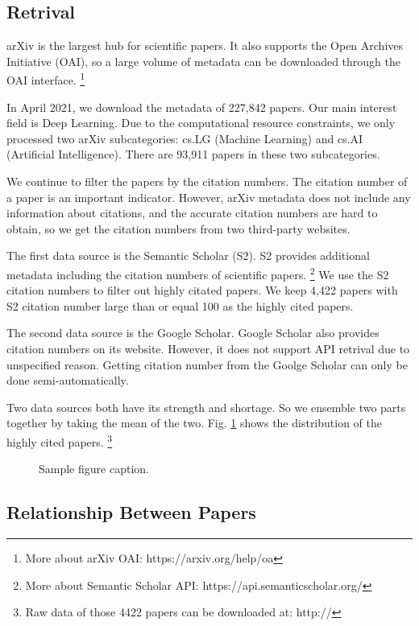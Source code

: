 \subsection{Retrival}

arXiv is the largest hub for scientific papers.
It also supports the Open Archives Initiative (OAI), 
so a large volume of metadata can be downloaded through the OAI interface.
\footnote{More about arXiv OAI: https://arxiv.org/help/oa}

In April 2021, we download the metadata of 227,842 papers.
Our main interest field is Deep Learning.
Due to the computational resource constraints, we only processed two arXiv subcategories: cs.LG (Machine Learning) and cs.AI (Artificial Intelligence).
There are 93,911 papers in these two subcategories.

We continue to filter the papers by the citation numbers.
The citation number of a paper is an important indicator.
However, arXiv metadata does not include any information about citations,
and the accurate citation numbers are hard to obtain, 
so we get the citation numbers from two third-party websites.

The first data source is the Semantic Scholar (S2).
S2 provides additional metadata including the citation numbers of scientific papers.
\footnote{More about Semantic Scholar API: https://api.semanticscholar.org/}
We use the S2 citation numbers to filter out highly citated papers.
We keep 4,422 papers with S2 citation number large than or equal 100 as the highly cited papers.

The second data source is the Google Scholar.
Google Scholar also provides citation numbers on its website.
However, it does not support API retrival due to unspecified reason.
Getting citation number from the Goolge Scholar can only be done semi-automatically.

Two data sources both have its strength and shortage.
So we ensemble two parts together by taking the mean of the two.
Fig. \ref{fig:distribution} shows the distribution of the highly cited papers.
\footnote{Raw data of those 4422 papers can be downloaded at: http://}

\begin{figure}
    \centering
    \fbox{\rule[-.5cm]{4cm}{4cm} \rule[-.5cm]{4cm}{0cm}}
    \caption{Sample figure caption.}
    \label{fig:distribution}
\end{figure}

\subsection{Relationship Between Papers}

